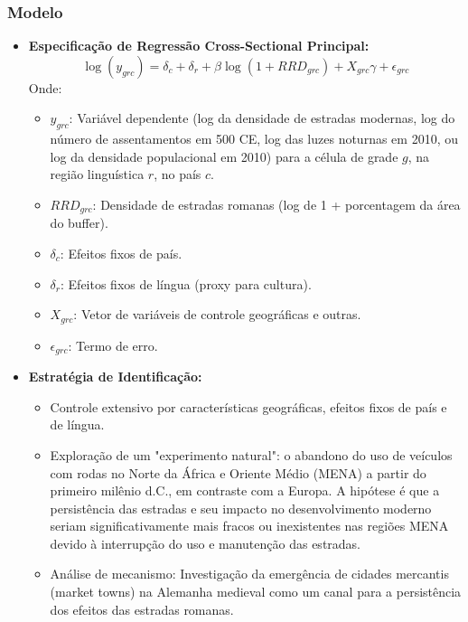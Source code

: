 \documentclass[12pt]{article}
\begin{document}
\subsubsection*{Modelo}
\begin{itemize}
    \item \textbf{Especificação de Regressão Cross-Sectional Principal:}
    \begin{equation} \label{eq:roman_roads_main}
        \log (y_{grc}) = \delta_c + \delta_r + \beta \log(1+RRD_{grc}) + X_{grc}\gamma + \epsilon_{grc}
    \end{equation}
    Onde:
    \begin{itemize}
        \item $y_{grc}$: Variável dependente (log da densidade de estradas modernas, log do número de assentamentos em 500 CE, log das luzes noturnas em 2010, ou log da densidade populacional em 2010) para a célula de grade $g$, na região linguística $r$, no país $c$.
        \item $RRD_{grc}$: Densidade de estradas romanas (log de 1 + porcentagem da área do buffer).
        \item $\delta_c$: Efeitos fixos de país.
        \item $\delta_r$: Efeitos fixos de língua (proxy para cultura).
        \item $X_{grc}$: Vetor de variáveis de controle geográficas e outras.
        \item $\epsilon_{grc}$: Termo de erro.
    \end{itemize}
    \item \textbf{Estratégia de Identificação:}
    \begin{itemize}
        \item Controle extensivo por características geográficas, efeitos fixos de país e de língua.
        \item Exploração de um "experimento natural": o abandono do uso de veículos com rodas no Norte da África e Oriente Médio (MENA) a partir do primeiro milênio d.C., em contraste com a Europa. A hipótese é que a persistência das estradas e seu impacto no desenvolvimento moderno seriam significativamente mais fracos ou inexistentes nas regiões MENA devido à interrupção do uso e manutenção das estradas.
        \item Análise de mecanismo: Investigação da emergência de cidades mercantis (market towns) na Alemanha medieval como um canal para a persistência dos efeitos das estradas romanas.
    \end{itemize}
\end{itemize}
\end{document}
